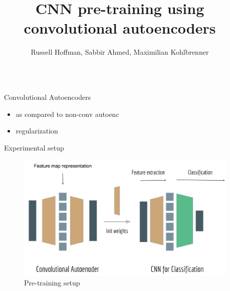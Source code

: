 \documentclass[final]{beamer}
\title{CNN pre-training using convolutional autoencoders} %
\author{Russell Hoffman, Sabbir Ahmed, Maximilian Kohlbrenner } %
\institute{TU Berlin} %
\newlength{\sepwid}
\newlength{\onecolwid}
\begin{document}

\setlength{\belowcaptionskip}{2ex} %
\setlength\belowdisplayshortskip{2ex} %

\begin{frame}[t] %

\begin{columns}[t] %

\begin{column}{\sepwid}\end{column} %

\begin{column}{\onecolwid} %


\begin{block}{Convolutional Autoencoders}

\begin{itemize}
	\item as compared to non-conv autoenc
	\item regularization
\end{itemize}

\end{block}


\begin{block}{Experimental setup}

\begin{figure}
\includegraphics[width=\linewidth]{graphics/setup.png}
\caption{Pre-training setup}
\end{figure}


\end{block}
\end{column}
\end{columns}
\end{frame}
\end{document}
